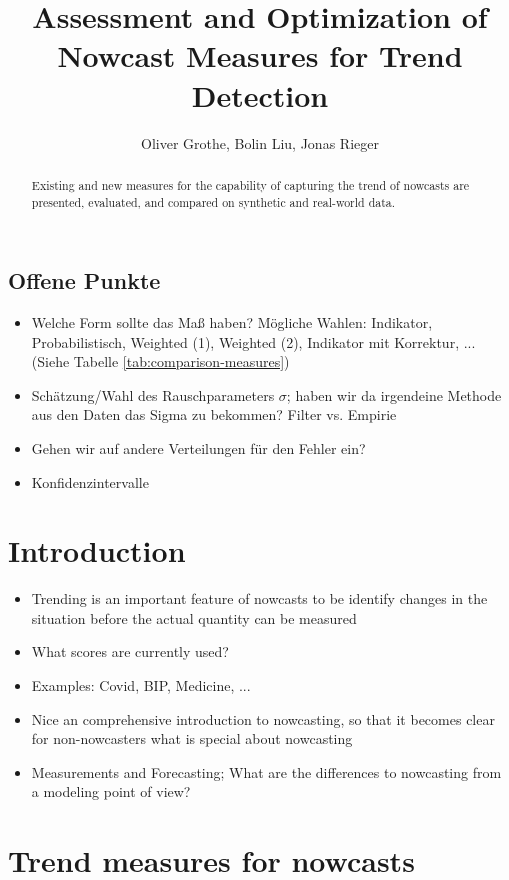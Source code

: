 \documentclass[oneside]{article}
\title{Assessment and Optimization of Nowcast Measures for Trend Detection}
\author{Oliver Grothe, Bolin Liu, Jonas Rieger}
\theoremstyle{plain}%
\theoremstyle{definition}
\begin{document}
\maketitle

\begin{abstract}
Existing and new measures for the capability of capturing the trend of nowcasts are presented, evaluated, and compared on synthetic and real-world data.
\end{abstract}

\subsection*{Offene Punkte}

\begin{itemize}
    \item Welche Form sollte das Maß haben? Mögliche Wahlen: Indikator, Probabilistisch, Weighted (1), Weighted (2), Indikator mit Korrektur, ... (Siehe Tabelle \ref{tab:comparison-measures})
    \item Schätzung/Wahl des Rauschparameters $\sigma$; haben wir da irgendeine Methode aus den Daten das Sigma zu bekommen? Filter vs. Empirie 
    \item Gehen wir auf andere Verteilungen für den Fehler ein?
    \item Konfidenzintervalle
\end{itemize}

\listoftodos


\section{Introduction}

\begin{itemize}
	\item Trending is an important feature of nowcasts to be identify changes in the situation before the actual quantity can be measured
	\item What scores are currently used?
	\item Examples: Covid, BIP, Medicine, ... 
 \item Nice an comprehensive introduction to nowcasting, so that it becomes clear for non-nowcasters what is special about nowcasting
 \item Measurements and Forecasting; What are the differences to nowcasting from a modeling point of view?
\end{itemize}


\section{Trend measures for nowcasts}
\end{document}

